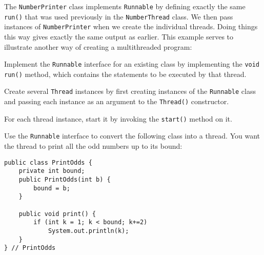 \noindent The {\tt NumberPrinter} class implements
{\tt Runnable} by defining exactly the same {\tt run()} that was used
previously in the {\tt NumberThread} class.  We then pass instances of
{\tt NumberPrinter} when we create the individual threads.  Doing
things this way gives exactly the same output as earlier.  This example
serves to illustrate another way of creating a multithreaded program:

\begin{BL}
\item Implement the {\tt Runnable} interface for an existing class
 by implementing the {\tt void run()} method, which contains the
 statements to be executed by that thread.

\item Create several {\tt Thread} instances by first creating
 instances of the {\tt Runnable} class and passing each instance as
 an argument to the {\tt Thread()} constructor.

\item For each thread instance, start it by invoking the {\tt start()} 
 method on it.
\end{BL}



\pagebreak
{}


\begin{SSTUDY}
\item  Use the {\tt Runnable} interface to convert the
following class into a thread.  You want the
thread to print all the odd numbers up to its bound:

\begin{jjjlisting}
\begin{lstlisting}
public class PrintOdds {
    private int bound;
    public PrintOdds(int b) {
        bound = b;
    }

    public void print() {
        if (int k = 1; k < bound; k+=2)
            System.out.println(k);
    }
} // PrintOdds
\end{lstlisting}
\end{jjjlisting}
\end{SSTUDY}

